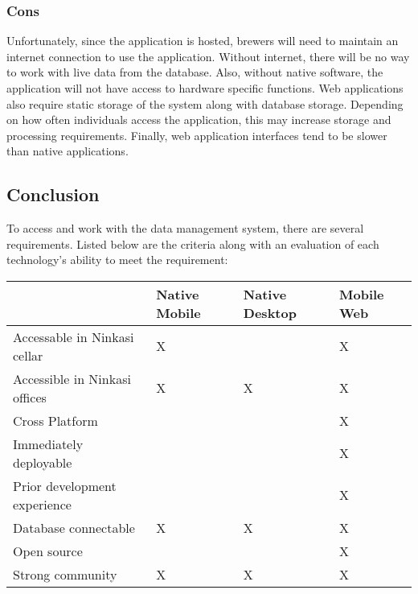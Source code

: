 \documentclass[draftclsnofoot,onecolumn,letterpaper,10pt,compsoc]{IEEEtran}
\begin{document}
		        \subsubsection{Cons}
		            Unfortunately, since the application is hosted, brewers will need to maintain an internet connection to use the application.
		            Without internet, there will be no way to work with live data from the database.
		            Also, without native software, the application will not have access to hardware specific functions.
		            Web applications also require static storage of the system along with database storage.
		            Depending on how often individuals access the application, this may increase storage and processing requirements.
		            Finally, web application interfaces tend to be slower than native applications\cite{LifeWireOverview}.

		    \subsection{Conclusion}
		    To access and work with the data management system, there are several requirements. Listed below are the criteria along with an evaluation of each technology's ability to meet the requirement:\\


		        \begin{center}
		            \begin{tabular}{ |m{14em}|m{9em}|m{9em}|m{9em}|}
		                \hline
		                    & Native Mobile & Native Desktop & Mobile Web \\

		                \hline
		                    Accessable in Ninkasi cellar & X & & X \\

		                \hline
		                    Accessible in Ninkasi offices & X & X & X \\

		                \hline
		                    Cross Platform &  &  & X \\

		                \hline
		                    Immediately deployable &  &  & X \\

		                \hline
		                    Prior development experience &  &  & X \\

		                \hline
		                     Database connectable & X & X & X \\

		                \hline
		                    Open source & & & X \\

		                \hline
		                    Strong community & X & X & X \\

		                \hline

		            \end{tabular}
		        \end{center}
\end{document}
